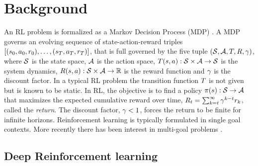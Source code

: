 \section{Background}

An RL problem is formalized as a Markov Decision Process (MDP)
\citep{sutton1998reinforcement}. A MDP governs
an evolving sequence of state-action-reward triples $[(s_0, a_0,
r_0), \dots, (s_T, a_T, r_T)]$, that is full governed
by the five tuple $(\mathcal{S}, \mathcal{A}, T, R, \gamma)$, where $\mathcal{S}$ is the
state space, $\mathcal{A}$ is the action space, $T(s,a) : \mathcal{S} \times \mathcal{A}
\rightarrow \mathcal{S}$ is the system dynamics, $R(s, a) : \mathcal{S} \times \mathcal{A}
\rightarrow \mathbb{R} $ is the reward function and $\gamma$ is the discount
factor.
In a typical RL problem the transition function $T$ is not given but is
known to be static.
In RL, the objective is to find a policy $\pi(s): \mathcal{S}
\rightarrow \mathcal{A}$ that
maximizes the expected cumulative
reward over time, $R_t = \sum_{k=t}^{\infty} \gamma^{k-t}r_{k}$, called the
\emph{return}. The discount factor, $\gamma < 1$, forces
the return to be finite for infinite horizons.  
Reinforcement learning is typically formulated in single goal
contexts. More recently there has been interest in multi-goal
problems
\citep{andrychowicz2017hindsight,pong2018temporal,plappert2018multi}.


\subsection{Deep Reinforcement learning}

